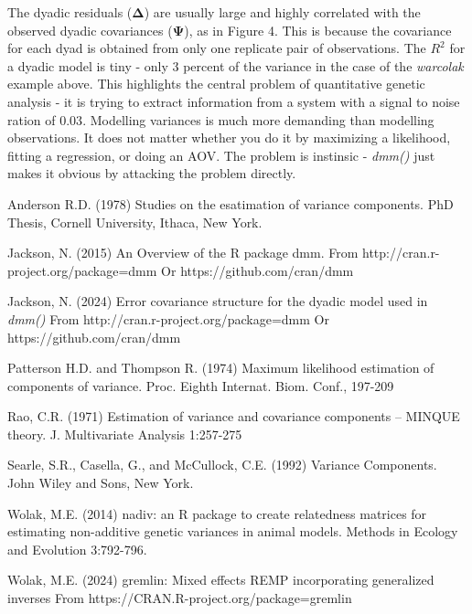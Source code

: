 \documentclass[titlepage,a4paper,12pt]{article}  %
\begin{document}
The dyadic residuals ($\bm{\Delta}$) are usually large and highly correlated with the observed dyadic covariances ($\bm{\Psi}$), as in Figure 4. This is because the covariance for each dyad is obtained from only one replicate pair of observations. The $R^{2}$ for a dyadic model is tiny - only 3 percent of the variance in the case of the {\em warcolak} example above. This highlights the central problem of quantitative genetic analysis - it is trying to extract information from a system with a signal to noise ration of $0.03$. Modelling variances is much more demanding than modelling observations. It does not matter whether you do it by maximizing a likelihood, fitting a regression, or doing an AOV. The problem is instinsic - {\em dmm()} just makes it obvious by attacking the problem directly.

\begin{thebibliography}{99}

Anderson R.D. (1978) Studies on the esatimation of variance components.
    PhD Thesis, Cornell University, Ithaca, New York.

Jackson, N. (2015) An Overview of the R package dmm.
    From http://cran.r-project.org/package=dmm 
    Or https://github.com/cran/dmm

Jackson, N. (2024) Error covariance structure for the dyadic model used in {\em dmm()}
    From http://cran.r-project.org/package=dmm
    Or https://github.com/cran/dmm

Patterson H.D. and Thompson R. (1974) Maximum likelihood estimation of components of variance. 
    Proc. Eighth Internat. Biom. Conf., 197-209

Rao, C.R. (1971) Estimation of variance and covariance components -- MINQUE theory.
    J. Multivariate Analysis 1:257-275

Searle, S.R., Casella, G., and McCullock, C.E. (1992) Variance Components.
    John Wiley and Sons, New York.

Wolak, M.E. (2014) nadiv: an R package to create relatedness matrices for
    estimating non-additive genetic variances in animal models.
    Methods in Ecology and Evolution 3:792-796.

Wolak, M.E. (2024) gremlin: Mixed effects REMP incorporating generalized inverses 
    From https://CRAN.R-project.org/package=gremlin 

\end{thebibliography}
\end{document}
